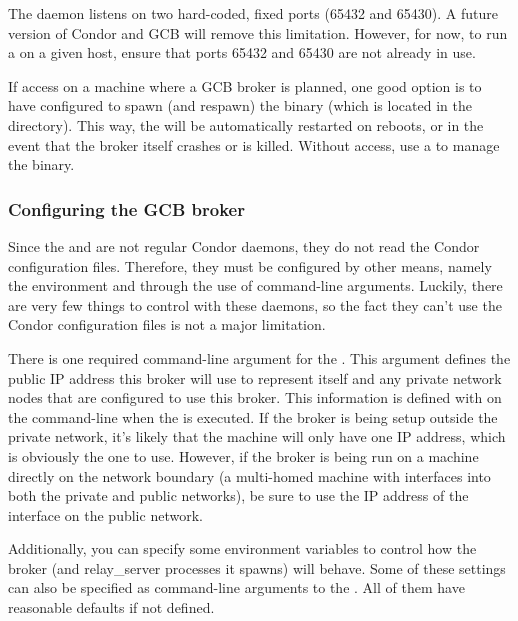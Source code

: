 The  daemon listens on two hard-coded,
fixed ports (65432 and 65430).
A future version of Condor and GCB will remove this limitation.
However, for now, to run a  on a
given host, ensure that ports 65432 and 65430 are not already
in use. 

If  access on a machine where a GCB 
broker is planned, one good option is to have  configured to
spawn (and respawn) the  binary (which is located in
the  directory).
This way, the  will be automatically restarted on
reboots, or in the event that the broker itself crashes or is killed.
Without  access, use a  to
manage the  binary. 

\subsubsection{\label{sec:GCB-Broker-Config}
Configuring the GCB broker}

Since the  and  are not
regular Condor daemons, they do not read the Condor configuration
files.
Therefore, they must be configured by other means, namely the
environment and through the use of command-line arguments.
Luckily, there are very few things to control with these daemons, so
the fact they can't use the Condor configuration files is not a major
limitation.

There is one required command-line argument for the .
This argument defines the public IP address this broker will use to
represent itself and any private network nodes that are configured to
use this broker.
This information is defined with  on the
command-line when the  is executed.
If the broker is being setup outside the private network, it's likely
that the machine will only have one IP address, which is obviously the
one to use.
However, if the broker is being run on a machine directly on the
network boundary (a multi-homed machine with interfaces into both the
private and public networks), be sure to use the IP address of the
interface on the public network.

Additionally, you can specify some environment variables to control
how the broker (and relay\_server processes it spawns) will behave.
Some of these settings can also be specified as command-line
arguments to the .
All of them have reasonable defaults if not defined.

